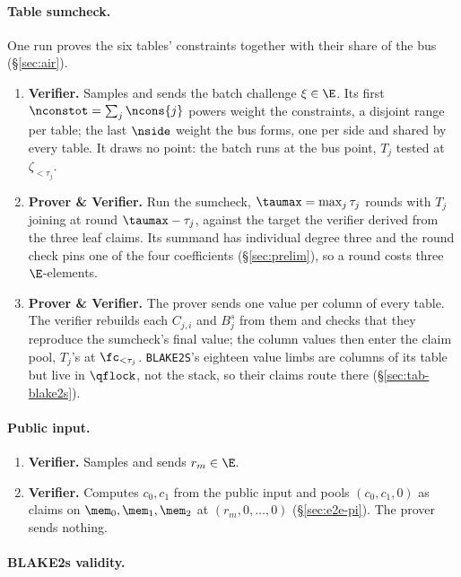 \paragraph{Table sumcheck.} One run proves the six tables' constraints together with their share of the bus (\S\ref{sec:air}).
\begin{enumerate}
\item \textbf{Verifier.} Samples and sends the batch challenge $\xi\in\E$. Its first $\nconstot=\sum_j\ncons{j}$ powers weight the constraints, a disjoint range per table; the last $\nside$ weight the bus forms, one per side and shared by every table. It draws no point: the batch runs at the bus point, $T_j$ tested at $\zeta_{<\tau_j}$.
\item \textbf{Prover \& Verifier.} Run the sumcheck, $\taumax=\max_j\tau_j$ rounds with $T_j$ joining at round $\taumax-\tau_j$, against the target the verifier derived from the three leaf claims. Its summand has individual degree three and the round check pins one of the four coefficients (\S\ref{sec:prelim}), so a round costs three $\E$-elements.
\item \textbf{Prover \& Verifier.} The prover sends one value per column of every table. The verifier rebuilds each $C_{j,i}$ and $B^{s}_j$ from them and checks that they reproduce the sumcheck's final value; the column values then enter the claim pool, $T_j$'s at $\fc_{<\tau_j}$. \texttt{BLAKE2S}'s eighteen value limbs are columns of its table but live in $\qflock$, not the stack, so their claims route there (\S\ref{sec:tab-blake2s}).
\end{enumerate}

\paragraph{Public input.}

\begin{enumerate}
\item \textbf{Verifier.} Samples and sends $r_m\in\E$.
\item \textbf{Verifier.} Computes $c_0,c_1$ from the public input and pools $(c_0,c_1,0)$ as claims on $\mem_0,\mem_1,\mem_2$ at $(r_m,0,\dots,0)$ (\S\ref{sec:e2e-pi}). The prover sends nothing.
\end{enumerate}

\paragraph{BLAKE2s validity.}

